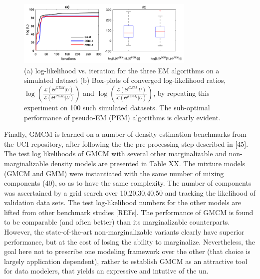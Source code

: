 \documentclass{article}
\begin{document}
\begin{figure}[ht]
\includegraphics[width= 240pt,keepaspectratio=true]{figures/EM_algo_comparisons}
\caption{(a) log-likelihood vs. iteration for the three EM algorithms on a simulated dataset (b) Box-plots of converged log-likelihood ratios,  $\log\left( \frac{\mathcal{L}\left(\Theta^{GEM}|U\right)}{\mathcal{L}\left(\Theta^{PEM_1}|U\right)}\right)$ and $\log\left( \frac{\mathcal{L}\left(\Theta^{GEM}|U\right)}{\mathcal{L}\left(\Theta^{PEM_2}|U\right)}\right)$, by repeating this experiment on 100 such simulated datasets. The sub-optimal performance of pseudo-EM (PEM) algorithms is clearly evident.}
\label{fig:EM_algo_comp}
\end{figure}  

Finally, GMCM is learned on a number of density estimation benchmarks from the UCI repository, after following the the pre-processing step described in [45]. The test log likelihoods of GMCM with several other marginalizable and non-marginalizable density models are presented in Table XX. The mixture models (GMCM and GMM) were instantiated with the same number of mixing components (40), so as to have the same complexity. The number of components was ascertained by a grid search over {10,20,30,40,50} and tracking the likelihood of validation data sets. The test log-likelihood numbers for the other models are lifted from other benchmark studies [REFs]. The performance of GMCM is found to be comparable (and often better) than its marginalizable counterparts. However, the state-of-the-art non-marginalizable variants clearly have superior performance, but at the cost of losing the ability to marginalize. Nevertheless, the goal here not to prescribe one modeling framework over the other (that choice is largely application dependent), rather to establish GMCM as an attractive tool for data modelers, that yields an expressive and intutive of the un. 
\end{document}
